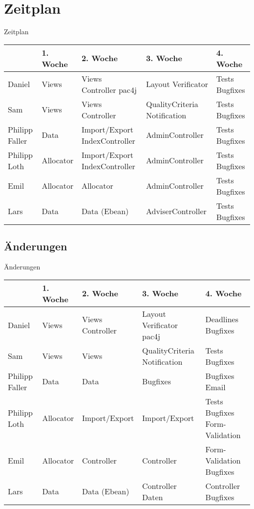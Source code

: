 \documentclass[18pt]{beamer}
\begin{document}
\section{Zeitplan}
\begin{frame}[plain]{Zeitplan}
\begin{table}[H]
\begin{tabularx}{\textwidth}{l|l X X X}
\hline
 	& 1. Woche			& 2. Woche		& 3. Woche & 4. Woche\\
\hline 
Daniel	& Views			& Views \phantom{+} Controller  pac4j & Layout \phantom{++} Verificator & Tests \phantom{++} Bugfixes \\
\hline
Sam & Views&Views \phantom{+} Controller & QualityCriteria  Notification & Tests \phantom{++} Bugfixes \\
\hline
Philipp Faller&Data&Import/Export
Index\-Controller&Admin\-Controller&Tests \phantom{++}
Bugfixes \\
\hline
Philipp Loth&Allocator&Import/Export
Index\-Controller&Admin\-Controller&Tests \phantom{++}
Bugfixes \\
\hline
Emil&Allocator&Allocator&Admin\-Controller&Tests \phantom{++}
Bugfixes \\
\hline
Lars&Data&Data \phantom{++} (Ebean)&Adviser\-Controller&Tests \phantom{++}
Bugfixes 
\end{tabularx}
\end{table}
\end{frame}

\subsection{Änderungen}
\begin{frame}[plain]{Änderungen}
\begin{table}[H]
\begin{tabularx}{\textwidth}{l|l X X X}
\hline
 	& 1. Woche			& 2. Woche		& 3. Woche & 4. Woche\\
\hline 
Daniel	& Views			& Views \phantom{+} Controller & Layout \phantom{+} Verificator
\phantom{+} pac4j&Deadlines Bugfixes \\
\hline
Sam & Views&Views& QualityCriteria Notification & Tests \phantom{++} Bugfixes \\
\hline
Philipp Faller&Data&Data&Bugfixes&Bugfixes \phantom{+}  Email\\
\hline
Philipp Loth&Allocator&Import/Export
&Import/Export &Tests \phantom{++} Bugfixes Form-Validation\\
\hline
Emil&Allocator&Controller&Controller&Form-Validation Bugfixes\\
\hline
Lars&Data&Data \phantom{++} (Ebean)&Controller \phantom{+} Daten &
Controller \phantom{+} Bugfixes \\
\end{tabularx}
\end{table}
\end{frame}
\end{document}
